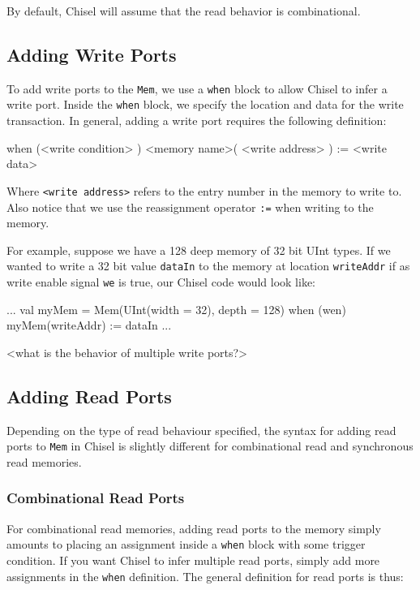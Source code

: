 By default, Chisel will assume that the read behavior is combinational.

\subsection{Adding Write Ports}

To add write ports to the \verb+Mem+, we use a \verb+when+ block to allow Chisel to infer a write port. Inside the \verb+when+ block, we specify the location and data for the write transaction. In general, adding a write port requires the following definition:

\begin{scala}
when (<write condition> ) {
  <memory name>( <write address> ) := <write data>
}
\end{scala}

Where \verb+<write address>+ refers to the entry number in the memory to write to. Also notice that we use the reassignment operator \verb+:=+ when writing to the memory. 


For example, suppose we have a 128 deep memory of 32 bit UInt types. If we wanted to write a 32 bit value \verb+dataIn+ to the memory at location \verb+writeAddr+ if as write enable signal \verb+we+ is true, our Chisel code would look like:

\begin{scala}
...
val myMem = Mem(UInt(width = 32), depth = 128)
when (wen) {
  myMem(writeAddr) := dataIn
}
...
\end{scala}

<what is the behavior of multiple write ports?>

\subsection{Adding Read Ports}

Depending on the type of read behaviour specified, the syntax for adding read ports to \verb+Mem+ in Chisel is slightly different for combinational read and synchronous read memories.

\subsubsection{Combinational Read Ports}

For combinational read memories, adding read ports to the memory simply amounts to placing an assignment inside a \verb+when+ block with some trigger condition. If you want Chisel to infer multiple read ports, simply add more assignments in the \verb+when+ definition. The general definition for read ports is thus:

